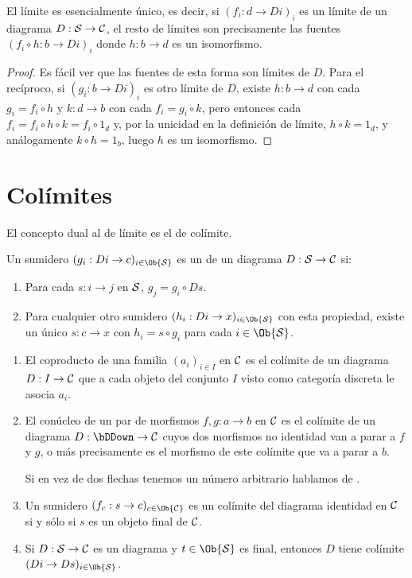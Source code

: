 \begin{proposition}
  El límite es esencialmente único, es decir, si $(f_i:d\to Di)_i$ es un límite
  de un diagrama $D:\mathcal{S}\to\mathcal{C}$, el resto de límites son precisamente las fuentes
  $(f_i\circ h:b\to Di)_i$ donde $h:b\to d$ es un isomorfismo.
\end{proposition}
\begin{proof}
  Es fácil ver que las fuentes de esta forma son límites de $D$. Para el
  recíproco, si $(g_i:b\to Di)_i$ es otro límite de $D$, existe $h:b\to d$ con
  cada $g_i=f_i\circ h$ y $k:d\to b$ con cada $f_i=g_i\circ k$, pero entonces
  cada $f_i=f_i\circ h\circ k=f_i\circ 1_d$ y, por la unicidad en la definición
  de límite, $h\circ k=1_d$, y análogamente $k\circ h=1_b$, luego $h$ es un
  isomorfismo.
\end{proof}

\section{Colímites}

El concepto dual al de límite es el de colímite.

\begin{definition}
  Un sumidero $(g_i: Di\to c)_{i\in\Ob{\cS}}$ es un  de un
  diagrama $D:\mathcal{S}\to\mathcal{C}$ si:
  \begin{enumerate}
  \item Para cada $s:i\to j$ en $\mathcal{S}$, $g_j=g_i\circ Ds$.
  \item Para cualquier otro sumidero $(h_i:Di\to x)_{i\in\Ob{\cS}}$ con esta
    propiedad, existe un único $s:c\to x$ con $h_i=s\circ g_i$ para cada
    $i\in\Ob{\cS}$.
  \end{enumerate}
\end{definition}

\begin{example}\;
  \begin{enumerate}
  \item El coproducto de una familia $(a_i)_{i\in I}$ en $\mathcal{C}$ es el colímite de
    un diagrama $D:I\to\mathcal{C}$ que a cada objeto del conjunto $I$ visto como
    categoría discreta le asocia $a_i$.
  \item El conúcleo de un par de morfismos $f,g:a\to b$ en $\mathcal{C}$ es el colímite
    de un diagrama $D:\bDDown\to\cC$ cuyos dos morfismos no identidad van a
    parar a $f$ y $g$, o más precisamente es el morfismo de este colímite que va
    a parar a $b$.

    Si en vez de dos flechas tenemos un número arbitrario hablamos de
    .
  \item Un sumidero $(f_c:s\to c)_{c\in\Ob{\cC}}$ es un colímite del diagrama
    identidad en $\mathcal{C}$ si y sólo si $s$ es un objeto final de $\mathcal{C}$.
  \item Si $D:\mathcal{S}\to\mathcal{C}$ es un diagrama y $t\in\Ob{\cS}$ es final, entonces $D$
    tiene colímite $(Di\to Ds)_{i\in\Ob{\cS}}$.
  \end{enumerate}
\end{example}

